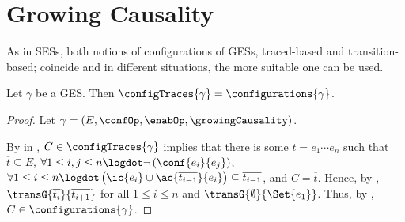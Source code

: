 \documentclass[runningheads,a4paper]{llncs}
\begin{document}
\section{Growing Causality}
As in SESs, both notions of configurations of GESs, traced-based and
transition-based; coincide and in different situations, the more suitable one
can be used.
\begin{lemma}\label{lma:GESConfigEquivalence}
	Let $ \gamma $ be a GES. Then $ \configTraces{\gamma} = \configurations{\gamma} $.
\end{lemma}
\begin{proof}
	Let $ \gamma = \left( E, \confOp, \enabOp, \growingCausality \right) $.
	
	By  in \cite{dynamicCausality15}, $ C \in \configTraces{\gamma} $ implies that there is some $ t = e_1 \cdots e_n $ such that $ \overline{t} \subseteq E $, $ \forall 1 \leq i, j \leq n \logdot \neg \left( \conf{e_i}{e_j} \right) $, $ \forall 1 \leq i \leq n \logdot \left( \ic{e_i} \cup \ac{\overline{t_{i - 1}}}{e_i} \right) \subseteq \overline{t_{i - 1}} $, and $ C = \overline{t} $. Hence, by , $ \transG{\overline{t_i}}{\overline{t_{i + 1}}} $ for all $ 1 \leq i \leq n $ and $ \transG{\emptyset}{\Set{ e_1 }} $.	Thus, by , $ C \in \configurations{\gamma} $.
	

\end{proof}
\end{document}
